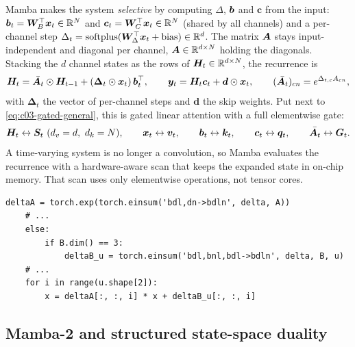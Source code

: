 Mamba \citep{gu2023mamba} makes the system \emph{selective} by computing $\Delta$, $\bm{b}$ and
$\bm{c}$ from the input: $\bm{b}_t=\bm{W}_B^{\top}\bm{x}_t\in\mathbb{R}^N$ and $\bm{c}_t=\bm{W}_C^{\top}\bm{x}_t\in\mathbb{R}^N$ (shared by all
channels) and a per-channel step $\Delta_t=\mathrm{softplus}(\bm{W}_\Delta^{\top}\bm{x}_t+\text{bias})\in\mathbb{R}^d$.
The matrix $\bm{A}$ stays input-independent and diagonal per channel, $\bm{A}\in\mathbb{R}^{d\times N}$ holding
the diagonals. Stacking the $d$ channel states as the rows of $\bm{H}_t\in\mathbb{R}^{d\times N}$, the
recurrence is
\begin{equation}\label{eq:c03-mamba1}
  \bm{H}_t=\bar{\bm{A}}_t\odot\bm{H}_{t-1}+(\bm\Delta_t\odot\bm{x}_t)\,\bm{b}_t^{\top},\qquad
  \bm{y}_t=\bm{H}_t\bm{c}_t+\bm{d}\odot\bm{x}_t,\qquad (\bar{\bm{A}}_t)_{cn}=e^{\Delta_{t,c}A_{cn}},
\end{equation}
with $\bm\Delta_t$ the vector of per-channel steps and $\bm{d}$ the skip weights. Put next to
\cref{eq:c03-gated-general}, this is gated linear attention with a full elementwise gate:
\[
  \bm{H}_t\leftrightarrow\bm{S}_t\ (d_v=d,\ d_k=N),\qquad
  \bm{x}_t\leftrightarrow\bm{v}_t,\qquad \bm{b}_t\leftrightarrow\bm{k}_t,\qquad \bm{c}_t\leftrightarrow\bm{q}_t,\qquad
  \bar{\bm{A}}_t\leftrightarrow\bm{G}_t .
\]
A time-varying system is no longer a convolution, so Mamba evaluates the recurrence with a
hardware-aware scan that keeps the expanded state in on-chip memory. That scan uses only
elementwise operations, not tensor cores.

\begin{lstlisting}[caption={Excerpt from \texttt{repos/\allowbreak state-spaces\_\_mamba/\allowbreak mamba\_ssm/\allowbreak ops/\allowbreak selective\_scan\_interface.py} (function \texttt{selective\_scan\_ref}): Mamba's selective scan in plain PyTorch. \texttt{u} is the input $x$, \texttt{delta} is $\Delta_t$, and the state \texttt{x} has shape (batch, $d$, $N$).},label={lst:c03-mamba1}]
    deltaA = torch.exp(torch.einsum('bdl,dn->bdln', delta, A))
    # ...
    else:
        if B.dim() == 3:
            deltaB_u = torch.einsum('bdl,bnl,bdl->bdln', delta, B, u)
    # ...
    for i in range(u.shape[2]):
        x = deltaA[:, :, i] * x + deltaB_u[:, :, i]
\end{lstlisting}

\subsection{Mamba-2 and structured state-space duality}

